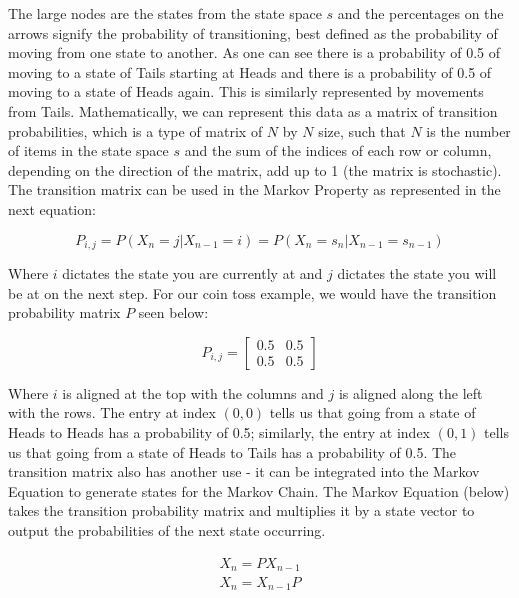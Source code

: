 \documentclass[12pt,final]{article}
\begin{document}
The large nodes are the states from the state space $s$ and the percentages on the arrows
signify the probability of transitioning, best defined as the probability of moving from one state
to another. As one can see there is a probability of 0.5 of moving to a state of Tails starting at
Heads and there is a probability of 0.5 of moving to a state of Heads again. This is similarly
represented by movements from Tails. Mathematically, we can represent this data as a matrix of
transition probabilities, which is a type of matrix of $N$ by $N$ size, such that $N$ is the
number of items in the state space $s$ and the sum of the indices of each row or column, depending
on the direction of the matrix, add up to 1 (the matrix is stochastic). The transition matrix can
be used in the Markov Property as represented in the next equation:

\begin{equation}
  P_{i,j} = P(X_n=j | X_{n-1} = i) = P(X_n=s_n | X_{n-1}=s_{n-1})
  \label{eq:markovpropertywithtransitionmatrix}
\end{equation}

Where $i$ dictates the state you are currently at and $j$ dictates the state you will be at on the
next step. For our coin toss example, we would have the transition probability matrix $P$
seen below:

\begin{equation}
  P_{i,j}=\begin{bmatrix}
    0.5 & 0.5 \\
    0.5 & 0.5
  \end{bmatrix}
  \label{eq:transitionprobabilitymatrixcointoss}
\end{equation}

Where $i$ is aligned at the top with the columns and $j$ is aligned along the left with the rows.
The entry at index $(0,0)$ tells us that going from a state of Heads to Heads has a probability
of 0.5; similarly, the entry at index $(0,1)$ tells us that going from a state of Heads to Tails
has a probability of 0.5. The transition matrix also has another use - it can be integrated into
the Markov Equation to generate states for the Markov Chain. The Markov Equation (below) takes
the transition probability matrix and multiplies it by a state vector to output the probabilities
of the next state occurring.

\begin{subequations}
\begin{align}
  X_n = PX_{n-1} \\
  X_n = X_{n-1}P
\end{align}
\label{eq:markovequation}
\end{subequations}
\end{document}
